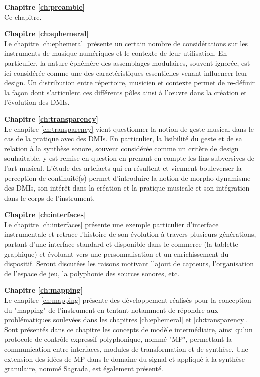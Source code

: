 \textbf{Chapitre \ref{ch:preamble}} \\[0.2em]
Ce chapitre.

\textbf{Chapitre \ref{ch:ephemeral}} \\[0.2em]
Le chapitre \ref{ch:ephemeral} présente un certain nombre de considérations sur les instruments de musique numériques et le contexte de leur utilisation. En particulier, la nature éphémère des assemblages modulaires, souvent ignorée, est ici considérée comme une des caractéristiques essentielles venant influencer leur design. Un distribution entre répertoire, musicien et contexte permet de re-définir la façon dont s'articulent ces différents pôles ainsi à l'œuvre dans la création et l'évolution des DMIs.

\textbf{Chapitre \ref{ch:transparency}} \\[0.2em]
Le chapitre \ref{ch:transparency} vient questionner la notion de geste musical dans le cas de la pratique avec des DMIs. En particulier, la lisibilité du geste et de sa relation à la synthèse sonore, souvent considérée comme un critère de design souhaitable, y est remise en question en prenant en compte les fins subversives de l'art musical. L'étude des artefacts qui en résultent et viennent bouleverser la perception de continuité(s) permet d'introduire la notion de morpho-dynamisme des DMIs, son intérêt dans la création et la pratique musicale et son intégration dans le corps de l'instrument.

\textbf{Chapitre \ref{ch:interfaces}} \\[0.2em]
Le chapitre \ref{ch:interfaces} présente une exemple particulier d'interface instrumentale et retrace l'histoire de son évolution à travers plusieurs générations, partant d'une interface standard et disponible dans le commerce (la tablette graphique) et évoluant vers une personnalisation et un enrichissement du dispositif. 
Seront discutées les raisons motivant l'ajout de capteurs, l'organisation de l'espace de jeu, la polyphonie des sources sonores, etc.

\textbf{Chapitre \ref{ch:mapping}} \\[0.2em]
Le chapitre \ref{ch:mapping} présente des développement réalisés pour la conception du "mapping" de l'instrument en tentant notamment de répondre aux problématiques soulevées dans les chapitres \ref{ch:ephemeral} et \ref{ch:transparency}. Sont présentés dans ce chapitre les concepts de modèle intermédiaire, ainsi qu'un protocole de contrôle expressif polyphonique, nommé "MP", permettant la communication entre interfaces, modules de transformation et de synthèse. Une extension des idées de MP dans le domaine du signal et appliqué à la synthèse granulaire, nommé Sagrada, est également présenté.

